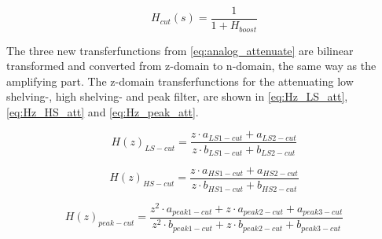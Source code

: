\begin{equation}\label{eq:analog_attenuate}
        H_{cut}(s) = \frac{1}{1 + H_{boost}}
    \end{equation}
    
    \startexplain
    \stopexplain
    
The three new transferfunctions from \autoref{eq:analog_attenuate} are bilinear transformed and converted from z-domain to n-domain, the same way as the amplifying part. The z-domain transferfunctions for the attenuating low shelving-, high shelving- and peak filter, are shown in \autoref{eq:Hz_LS_att}, \autoref{eq:Hz_HS_att} and \autoref{eq:Hz_peak_att}.

\begin{equation}\label{eq:Hz_LS_att}
        H(z)_{LS-cut} =\frac{z \cdot a_{LS1-cut} + a_{LS2-cut}}{z \cdot b_{LS1-cut} + b_{LS2-cut}}
    \end{equation}
    
    \startexplain
    \stopexplain
    
\begin{equation}\label{eq:Hz_HS_att}
        H(z)_{HS-cut} = \frac{z \cdot a_{HS1-cut} + a_{HS2-cut}}{z \cdot b_{HS1-cut} + b_{HS2-cut}}
    \end{equation}
    
    \startexplain
    \stopexplain

\begin{equation}\label{eq:Hz_peak_att}
        H(z)_{peak-cut} =  \frac{z^2 \cdot a_{peak1-cut} + z \cdot a_{peak2-cut} + a_{peak3-cut}}{z^2 \cdot b_{peak1-cut} + z \cdot b_{peak2-cut} + b_{peak3-cut}}
    \end{equation}
    
